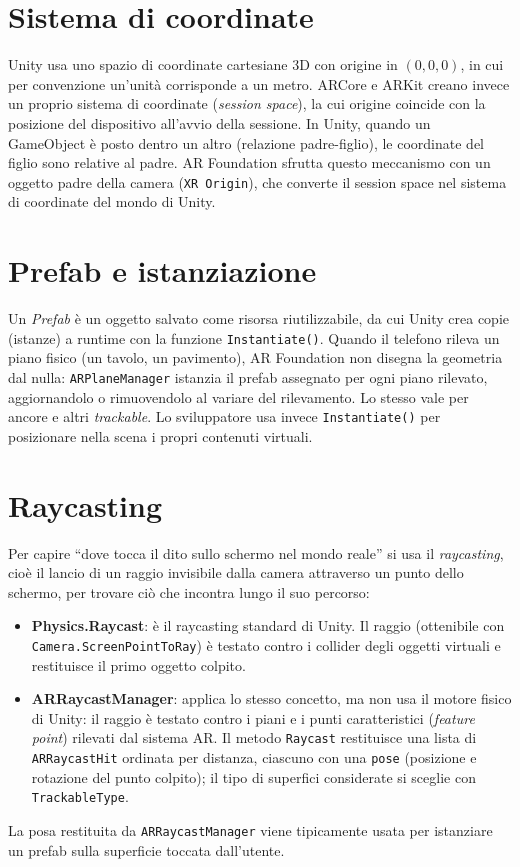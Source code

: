 \section{Sistema di coordinate}
Unity usa uno spazio di coordinate cartesiane 3D con origine in $(0,0,0)$, in cui per convenzione un'unità corrisponde a un metro. ARCore e ARKit creano invece un proprio sistema di coordinate (\textit{session space}), la cui origine coincide con la posizione del dispositivo all'avvio della sessione. In Unity, quando un GameObject è posto dentro un altro (relazione padre-figlio), le coordinate del figlio sono relative al padre. AR Foundation sfrutta questo meccanismo con un oggetto padre della camera (\texttt{XR Origin}), che converte il session space nel sistema di coordinate del mondo di Unity.

\section{Prefab e istanziazione}
Un \textit{Prefab} è un oggetto salvato come risorsa riutilizzabile, da cui Unity crea copie (istanze) a runtime con la funzione \texttt{Instantiate()}. Quando il telefono rileva un piano fisico (un tavolo, un pavimento), AR Foundation non disegna la geometria dal nulla: \texttt{ARPlaneManager} istanzia il prefab assegnato per ogni piano rilevato, aggiornandolo o rimuovendolo al variare del rilevamento. Lo stesso vale per ancore e altri \textit{trackable}. Lo sviluppatore usa invece \texttt{Instantiate()} per posizionare nella scena i propri contenuti virtuali.

\section{Raycasting}
Per capire ``dove tocca il dito sullo schermo nel mondo reale'' si usa il \textit{raycasting}, cioè il lancio di un raggio invisibile dalla camera attraverso un punto dello schermo, per trovare ciò che incontra lungo il suo percorso:

\begin{itemize}
    \item \textbf{Physics.Raycast}: è il raycasting standard di Unity. Il raggio (ottenibile con \texttt{Camera.ScreenPointToRay}) è testato contro i collider degli oggetti virtuali e restituisce il primo oggetto colpito.
    \item \textbf{ARRaycastManager}: applica lo stesso concetto, ma non usa il motore fisico di Unity: il raggio è testato contro i piani e i punti caratteristici (\textit{feature point}) rilevati dal sistema AR. Il metodo \texttt{Raycast} restituisce una lista di \texttt{ARRaycastHit} ordinata per distanza, ciascuno con una \texttt{pose} (posizione e rotazione del punto colpito); il tipo di superfici considerate si sceglie con \texttt{TrackableType}.
\end{itemize}

La posa restituita da \texttt{ARRaycastManager} viene tipicamente usata per istanziare un prefab sulla superficie toccata dall'utente.